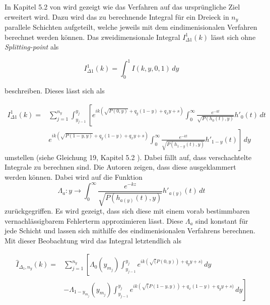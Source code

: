 In Kapitel 5.2 von \cite*{gasperini:hal-03209144} wird gezeigt wie das Verfahren auf das ursprüngliche Ziel erweitert wird.
Dazu wird das zu berechnende Integral für ein Dreieck in $n_y$ parallele Schichten aufgeteilt, welche jeweils mit dem eindimenisionalen Verfahren berechnet werden können.
Das zweidimensionale Integral $I_{\Delta1}^1(k)$ lässt sich ohne \textit{Splitting-point} als

\begin{equation}
    I_{\Delta1}^1(k) = \int_{0}^{1} I(k,y,0,1) \,dy 
\end{equation}

beschreiben. Dieses lässt sich als

\begin{equation}
    \begin{aligned}
    I_{\Delta1}^1(k) =&  \sum_{j = 1}^{n_y}  \int_{y_{j-1}}^{y_j} \left[ e^{ik(\sqrt{P(0,y)}+q_y(1-y)+q_xy+s)} \int_{0}^{\infty} \frac{e^{-kt}}{\sqrt{P(h_0(t),y)}}h'_0(t) \,dt  \right. \\
    & \left. e^{ik(\sqrt{P(1-y,y)}+q_y(1-y)+q_xy+s)} \int_{0}^{\infty} \frac{e^{-kt}}{\sqrt{P(h_{1-y}(t),y)}}h'_{1-y}(t) \right] \,dy  
    \end{aligned}
\end{equation}
umstellen (siehe Gleichung 19, Kapitel 5.2 \cite{gasperini:hal-03209144}). Dabei fällt auf, dass verschachtelte Integrale zu berechnen sind. Die Autoren zeigen, dass diese ausgeklammert werden können.
Dabei wird auf die Funktion 
\begin{equation}
  \Lambda_a : y \rightarrow \int_{0}^{\infty} \frac{e^{-kz}}{\sqrt{P(h_{a(y)}(t),y)}} h'_{a(y)}(t) \,dt 
\end{equation}
zurückgegriffen. Es wird gezeigt, dass sich diese mit einem vorab bestimmbaren vernachlässigbarem Fehlerterm approximieren lässt. Diese $\Lambda_a$ sind konstant für jede Schicht und lassen sich mithilfe des eindimenisionalen Verfahrens berechnen.
Mit dieser Beobachtung wird das Integral letztendlich als

\begin{equation}
    \begin{aligned}
        \hat{I}_{\Delta_1,n_y}(k) = & \sum_{j = 1}^{n_y} \left[ \Lambda_0(y_{m_j}) \int_{y_{j-1}}^{y_j}  e^{ik(\sqrt(P(0,y))+q_yy+s)}\,dy \right.\\
        & \left.  - \Lambda_{1-y_{m_j}}(y_{m_j}) \int_{y_{j-1}}^{y_j}  e^{ik(\sqrt(P(1-y,y))+q_x(1-y)+q_yy+s)}\,dy  \right] \\
    \end{aligned}
\end{equation}

